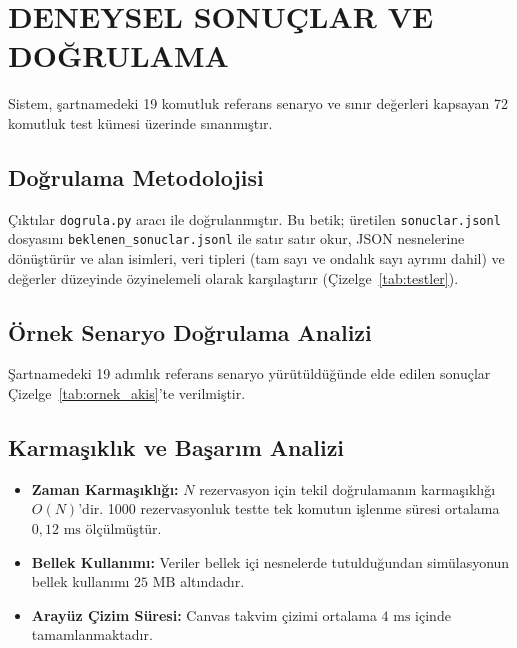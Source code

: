 \documentclass[conference]{IEEEtran}
\begin{document}
\section{DENEYSEL SONUÇLAR VE DOĞRULAMA}

Sistem, şartnamedeki 19 komutluk referans senaryo ve sınır değerleri kapsayan 72 komutluk test kümesi üzerinde sınanmıştır.

\subsection{Doğrulama Metodolojisi}
Çıktılar \texttt{dogrula.py} aracı ile doğrulanmıştır. Bu betik; üretilen \texttt{sonuclar.jsonl} dosyasını \texttt{beklenen\_}\allowbreak\texttt{sonuclar.jsonl} ile satır satır okur, JSON nesnelerine dönüştürür ve alan isimleri, veri tipleri (tam sayı ve ondalık sayı ayrımı dahil) ve değerler düzeyinde özyinelemeli olarak karşılaştırır (Çizelge~\ref{tab:testler}).

\begin{table}[H]
\vspace{-4pt}
\caption{DOĞRULAMA VE TEST BAŞARIM MATRİSİ}
\label{tab:testler}
\centering
{}
\vspace{-4pt}
\end{table}
\addtocounter{table}{1}

\subsection{Örnek Senaryo Doğrulama Analizi}
Şartnamedeki 19 adımlık referans senaryo yürütüldüğünde elde edilen sonuçlar Çizelge~\ref{tab:ornek_akis}'te verilmiştir.

\subsection{Karmaşıklık ve Başarım Analizi}
\begin{itemize}\setlength{\itemsep}{1pt}\setlength{\parskip}{0pt}
    \item \textbf{Zaman Karmaşıklığı:} $N$ rezervasyon için tekil doğrulamanın karmaşıklığı $O(N)$'dir. 1000 rezervasyonluk testte tek komutun işlenme süresi ortalama $0{,}12\text{ ms}$ ölçülmüştür.
    \item \textbf{Bellek Kullanımı:} Veriler bellek içi nesnelerde tutulduğundan simülasyonun bellek kullanımı $25\text{ MB}$ altındadır.
    \item \textbf{Arayüz Çizim Süresi:} Canvas takvim çizimi ortalama $4\text{ ms}$ içinde tamamlanmaktadır.
\end{itemize}
\end{document}
